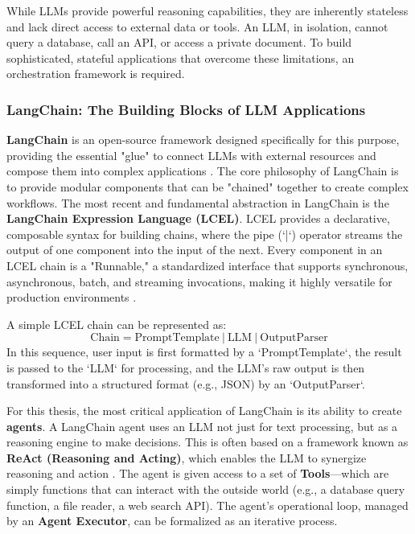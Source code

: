 While LLMs provide powerful reasoning capabilities, they are inherently stateless and lack direct access to external data or tools. An LLM, in isolation, cannot query a database, call an API, or access a private document. To build sophisticated, stateful applications that overcome these limitations, an orchestration framework is required.

\subsubsection{LangChain: The Building Blocks of LLM Applications}
\label{subsubsec:langchain_building_blocks}

\textbf{LangChain} is an open-source framework designed specifically for this purpose, providing the essential "glue" to connect LLMs with external resources and compose them into complex applications \cite{barua2024llmagentsreview,yu2025agentworkflow}. The core philosophy of LangChain is to provide modular components that can be "chained" together to create complex workflows. The most recent and fundamental abstraction in LangChain is the \textbf{LangChain Expression Language (LCEL)}. LCEL provides a declarative, composable syntax for building chains, where the pipe (`|`) operator streams the output of one component into the input of the next. Every component in an LCEL chain is a "Runnable," a standardized interface that supports synchronous, asynchronous, batch, and streaming invocations, making it highly versatile for production environments \cite{yu2025agentworkflow, pospech2025metagraph}.

A simple LCEL chain can be represented as:
$$ \text{Chain} = \text{PromptTemplate} \ | \ \text{LLM} \ | \ \text{OutputParser} $$
In this sequence, user input is first formatted by a `PromptTemplate`, the result is passed to the `LLM` for processing, and the LLM's raw output is then transformed into a structured format (e.g., JSON) by an `OutputParser`.

For this thesis, the most critical application of LangChain is its ability to create \textbf{agents}. A LangChain agent uses an LLM not just for text processing, but as a reasoning engine to make decisions. This is often based on a framework known as \textbf{ReAct (Reasoning and Acting)}, which enables the LLM to synergize reasoning and action \cite{yao2022react, barua2024llmagentsreview}. The agent is given access to a set of \textbf{Tools}—which are simply functions that can interact with the outside world (e.g., a database query function, a file reader, a web search API). The agent's operational loop, managed by an \textbf{Agent Executor}, can be formalized as an iterative process.

